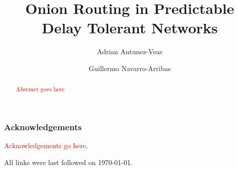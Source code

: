 \documentclass[runningheads,a4paper]{llncs}
\newcommand{\red}[1]{\textcolor{red}{#1}}
\begin{document}


\title{Onion Routing in Predictable Delay Tolerant Networks}

\author{Adrian Antunez-Veas \and Guillermo Navarro-Arribas}

%
\iffalse
\author{Firstname Lastname\inst{1} \and Firstname Lastname\inst{2} }

\institute{
Insitute 1\\
\email{...}\and
Insitute 2\\
\email{...}
}
\fi
			
\maketitle

\begin{abstract}
\red{Abstract goes here}
\end{abstract}














\subsubsection*{Acknowledgements}

\red{Acknowledgements go here}.




All links were last followed on \today.


\end{document}
